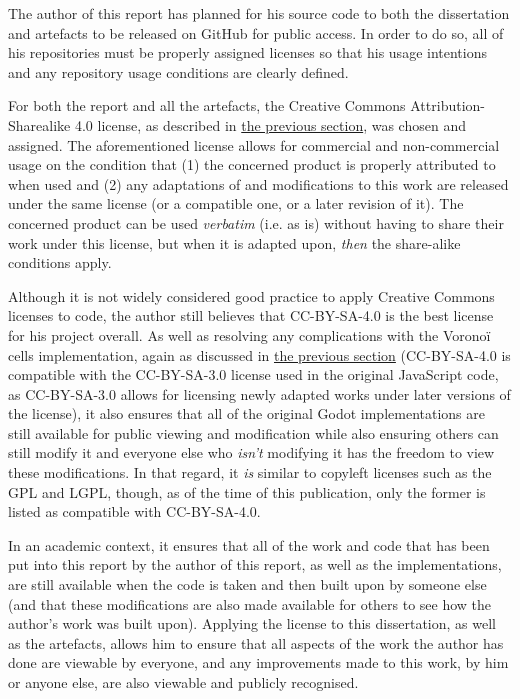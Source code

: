 The author of this report has planned for his source code to both the dissertation and artefacts to be released on GitHub for public access. In order to do so, all of his repositories must be properly assigned licenses so that his usage intentions and any repository usage conditions are clearly defined. 

For both the report and all the artefacts, the Creative Commons Attribution-Sharealike 4.0 license, as described in \hyperref[howuse]{the previous section}, was chosen and assigned. The aforementioned license allows for commercial and non-commercial usage on the condition that (1) the concerned product is properly attributed to when used and (2) any adaptations of and modifications to this work are released under the same license (or a compatible one, or a later revision of it).\cite{cc_at_sa_4} The concerned product can be used \textit{verbatim} (i.e. as is) without having to share their work under this license, but when it is adapted upon, \textit{then} the share-alike conditions apply.

Although it is not widely considered good practice to apply Creative Commons licenses to code\cite{cc_faq_code}, the author still believes that CC-BY-SA-4.0 is the best license for his project overall. As well as resolving any complications with the Voronoï cells implementation, again as discussed in \hyperref[howuse]{the previous section} (CC-BY-SA-4.0 is compatible with the CC-BY-SA-3.0 license used in the original JavaScript code, as CC-BY-SA-3.0 allows for licensing newly adapted works under later versions of the license\cite{cc_compat}), it also ensures that all of the original Godot implementations are still available for public viewing and modification while also ensuring others can still modify it and everyone else who \textit{isn't} modifying it has the freedom to view these modifications. In that regard, it \textit{is} similar to copyleft licenses such as the GPL and LGPL, though, as of the time of this publication, only the former is listed as compatible with CC-BY-SA-4.0.\cite{cc_compat}

In an academic context, it ensures that all of the work and code that has been put into this report by the author of this report, as well as the implementations, are still available when the code is taken and then built upon by someone else (and that these modifications are also made available for others to see how the author's work was built upon). Applying the license to this dissertation, as well as the artefacts, allows him to ensure that all aspects of the work the author has done are viewable by everyone, and any improvements made to this work, by him or anyone else, are also viewable and publicly recognised.

